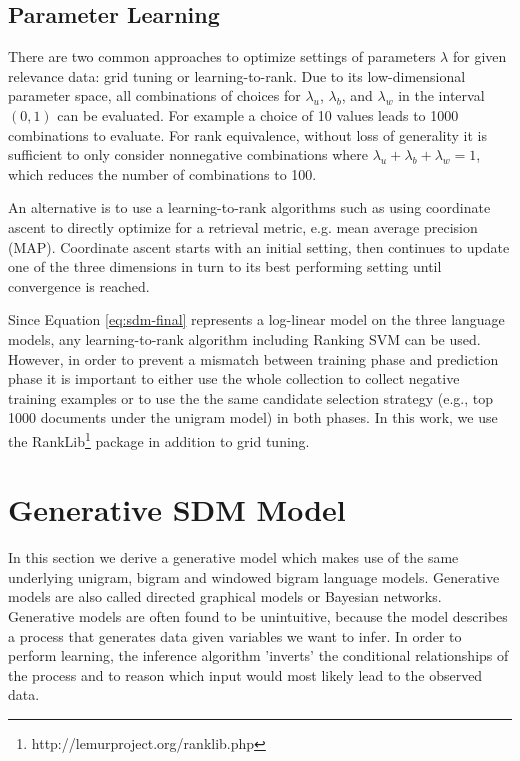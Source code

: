 \documentclass[]{article}
\begin{document}
\subsection{Parameter Learning}

There are two common approaches to optimize settings of parameters
$\lambda$ for given relevance data: grid tuning or learning-to-rank.
Due to its low-dimensional parameter space, all combinations of choices
for $\lambda_{u}$, $\lambda_{b}$, and $\lambda_{w}$ in the interval
$(0,1)$ can be evaluated. For example a choice of 10 values leads
to 1000 combinations to evaluate. For rank equivalence, without loss
of generality it is sufficient to only consider nonnegative combinations where
$\lambda_{u}+\lambda_{b}+\lambda_{w}=1$, which reduces the number
of combinations to 100.

An alternative is to use a learning-to-rank algorithms such as using
coordinate ascent to directly optimize for a retrieval metric, e.g.
mean average precision (MAP). Coordinate ascent starts with an initial
setting, then continues to update one of the three dimensions in turn
to its best performing setting until convergence is reached. 

Since Equation \ref{eq:sdm-final} represents a log-linear model on
the three language models, any learning-to-rank algorithm including
Ranking SVM \cite{joachims2002ranksvm} can be used. However, in order
to prevent a mismatch between training phase and prediction phase
it is important to either use the whole collection to collect negative
training examples or to use the the same candidate selection strategy
(e.g., top 1000 documents under the unigram model) in both phases.
In this work, we use the RankLib\footnote{http://lemurproject.org/ranklib.php}
package in addition to grid tuning.

\section{Generative SDM Model}

\label{sec:genSDM}In this section we derive a generative model which
makes use of the same underlying unigram, bigram and windowed bigram
language models. Generative models are also called directed graphical
models or Bayesian networks. Generative models are often found to
be unintuitive, because the model describes a process that generates
data given variables we want to infer. In order to perform learning,
the inference algorithm 'inverts' the conditional relationships of
the process and to reason which input would most likely lead to the
observed data. 
\end{document}

